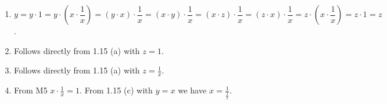 \begin{solution}
\begin{enumerate}[label=(\alph*)]
\item \[y = y \cdot 1 = y \cdot (x \cdot \frac{1}{x}) = (y \cdot x) \cdot \frac{1}{x} = (x \cdot y) \cdot \frac{1}{x} = (x \cdot z) \cdot \frac{1}{x} = (z \cdot x) \cdot \frac{1}{x} = z \cdot (x \cdot \frac{1}{x}) = z \cdot 1 = z\].
\item Follows directly from 1.15 (a) with $z = 1$.
\item Follows directly from 1.15 (a) with $z = \frac{1}{x}$.
\item From M5 $x \cdot \frac{1}{x} = 1$. From 1.15 (c) with $y = x$ we have $x = \frac{1}{\frac{1}{x}}$.
\end{enumerate}
\end{solution}

